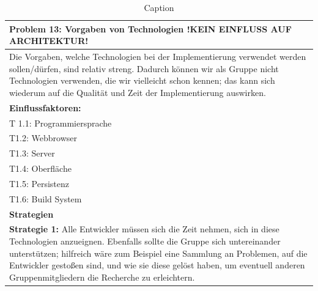 \documentclass[enabledeprecatedfontcommands,fontsize=12pt,paper=a4,twoside]{scrartcl}
\begin{document}
\begin{table}[H]
    \centering
    \begin{tabular}{|p{15cm}|}
    \hline
          \textbf{Problem 13:} Vorgaben von Technologien !KEIN EINFLUSS AUF ARCHITEKTUR!
          \\ \hline
          Die Vorgaben, welche Technologien bei der Implementierung verwendet werden sollen/dürfen, sind relativ streng. Dadurch können wir als Gruppe nicht Technologien verwenden, die wir vielleicht schon kennen; das kann sich wiederum auf die Qualität und Zeit der Implementierung auswirken.
          \\ \hline
          \textbf{Einflussfaktoren: } \\
          T 1.1: Programmiersprache \\
          T1.2: Webbrowser \\
          T1.3: Server \\
          T1.4: Oberfläche \\
          T1.5: Persistenz \\
          T1.6: Build System \\
          \hline
          \textbf{Strategien} \\ \hline
          \textbf{Strategie 1:} Alle Entwickler müssen sich die Zeit nehmen, sich in diese Technologien anzueignen. Ebenfalls sollte die Gruppe sich untereinander unterstützen; hilfreich wäre zum Beispiel eine Sammlung an Problemen, auf die Entwickler gestoßen sind, und wie sie diese gelöst haben, um eventuell anderen Gruppenmitgliedern die Recherche zu erleichtern.
          \\ \hline
    \end{tabular}
    \caption{Caption}
    \label{tab:my_label}
\end{table}
\end{document}
